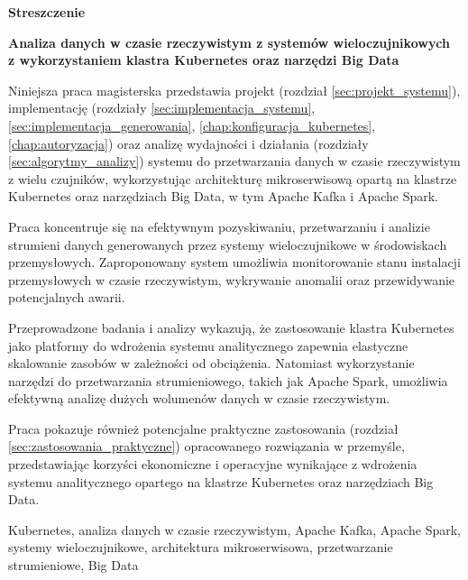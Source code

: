 \begin{abstract_pl}
\begin{center}
\textbf{\large Streszczenie}
\end{center}

\begin{center}
 \textbf{Analiza danych w czasie rzeczywistym z systemów wieloczujnikowych \\ z wykorzystaniem klastra Kubernetes oraz narzędzi Big Data}\\
\end{center}

Niniejsza praca magisterska przedstawia projekt (rozdział \ref{sec:projekt_systemu}), implementację (rozdziały \ref{sec:implementacja_systemu}, \ref{sec:implementacja_generowania}, \ref{chap:konfiguracja_kubernetes}, \ref{chap:autoryzacja}) oraz analizę wydajności i działania (rozdziały \ref{sec:algorytmy_analizy}) systemu do przetwarzania danych w czasie rzeczywistym z wielu czujników, wykorzystując architekturę mikroserwisową opartą na klastrze Kubernetes oraz narzędziach Big Data, w tym Apache Kafka i Apache Spark.

Praca koncentruje się na efektywnym pozyskiwaniu, przetwarzaniu i analizie strumieni danych generowanych przez systemy wieloczujnikowe w środowiskach przemysłowych. Zaproponowany system umożliwia monitorowanie stanu instalacji przemysłowych w czasie rzeczywistym, wykrywanie anomalii oraz przewidywanie potencjalnych awarii.

Przeprowadzone badania i analizy wykazują, że zastosowanie klastra Kubernetes jako platformy do wdrożenia systemu analitycznego zapewnia elastyczne skalowanie zasobów w zależności od obciążenia. Natomiast wykorzystanie narzędzi do przetwarzania strumieniowego, takich jak Apache Spark, umożliwia efektywną analizę dużych wolumenów danych w czasie rzeczywistym.

Praca pokazuje również potencjalne praktyczne zastosowania (rozdział \ref{sec:zastosowania_praktyczne}) opracowanego rozwiązania w przemyśle, przedstawiając korzyści ekonomiczne i operacyjne wynikające z wdrożenia systemu analitycznego opartego na klastrze Kubernetes oraz narzędziach Big Data.

\begin{keywords}
Kubernetes, analiza danych w czasie rzeczywistym, Apache Kafka, Apache Spark, systemy wieloczujnikowe, architektura mikroserwisowa, przetwarzanie strumieniowe, Big Data
\end{keywords}
\end{abstract_pl}